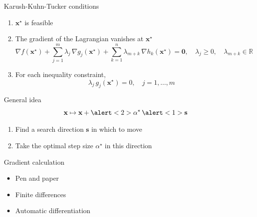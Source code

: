 \documentclass[12pt,aspectratio=169]{beamer}
\renewcommand{\vec}[1]{\ensuremath{\mathbf{#1}}}
\newcommand{\R}{\ensuremath{\mathbb{R}}}
\begin{document}
\begin{frame}{Karush-Kuhn-Tucker conditions}
    \begin{enumerate}
        \setlength{\itemsep}{\bigskipamount}
        \item $\vec{x}^{\star}$ is feasible
        \item The gradient of the Lagrangian vanishes at $\vec{x}^{\star}$
              \[
                  \nabla f(\vec{x}^{\star}) +
                  \sum_{j = 1}^{m} \lambda_{j} \, \nabla g_{j}(\vec{x}^{\star}) +
                  \sum_{k = 1}^{n} \lambda_{m + k} \, \nabla h_{k}(\vec{x}^{\star})
                  = \vec{0},
                  \quad
                  \lambda_{j} \geq 0,
                  \quad
                  \lambda_{m + k} \in \R
              \]
        \item For each inequality constraint,
              \[
                  \lambda_{j} \, g_{j}(\vec{x}^{\star}) = 0,
                  \quad
                  j = 1, \ldots, m
              \]
    \end{enumerate}
\end{frame}

\begin{frame}{General idea}
        \[
            \vec{x} \mapsto \vec{x} + \alert<2>{\alpha^{\star}} \, \alert<1>{\vec{s}}
        \]
        \vfill
        \begin{enumerate}
            \item Find a \alert<1>{search direction $\vec{s}$} in which to move
            \item Take the \alert<2>{optimal step size $\alpha^{\star}$} in this
                  direction
        \end{enumerate}
\end{frame}

\begin{frame}{Gradient calculation}
    \begin{itemize}
        \setlength{\itemsep}{\bigskipamount}
        \item Pen and paper
        \item Finite differences
        \item Automatic differentiation
    \end{itemize}
\end{frame}
\end{document}
